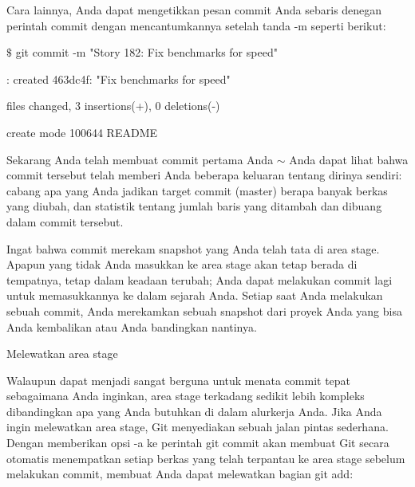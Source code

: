 \noindent 
{\fontsize{14pt}{14pt}\selectfont Cara lainnya, Anda dapat mengetikkan pesan commit Anda sebaris denegan perintah $  $commit $  $dengan mencantumkannya setelah tanda -m seperti berikut: \\} \par
\vspace{14pt}
\noindent 
{\fontsize{14pt}{14pt}\selectfont  $  \$  $ git commit -m "Story 182: Fix benchmarks for speed" \\} \par
\noindent 
{\fontsize{14pt}{14pt}\selectfont [master]: created 463dc4f: "Fix benchmarks for speed" \\} \par
\noindent 
{\fontsize{14pt}{14pt} files changed, 3 insertions(+), 0 deletions(-) \\} \par
\noindent 
{\fontsize{14pt}{14pt}\selectfont create mode 100644 README \\} \par
\vspace{14pt}
\noindent 
{\fontsize{14pt}{14pt}\selectfont Sekarang Anda telah membuat commit pertama Anda $  \sim  $ Anda dapat lihat bahwa commit tersebut telah memberi Anda beberapa keluaran tentang dirinya sendiri: cabang apa yang Anda jadikan target commit (master) berapa banyak berkas yang diubah, dan statistik tentang jumlah baris yang ditambah dan dibuang dalam commit tersebut. \\} \par
\noindent 
{\fontsize{14pt}{14pt}\selectfont Ingat bahwa commit merekam snapshot yang Anda telah tata di area stage. Apapun yang tidak Anda masukkan ke area stage akan tetap berada di tempatnya, tetap dalam keadaan terubah; Anda dapat melakukan commit lagi untuk memasukkannya ke dalam sejarah Anda. Setiap saat Anda melakukan sebuah commit, Anda merekamkan sebuah snapshot dari proyek Anda yang bisa Anda kembalikan atau Anda bandingkan nantinya. \\} \par
\vspace{14pt}
\noindent 
{\fontsize{14pt}{14pt}\selectfont Melewatkan area stage \\} \par
\noindent 
{\fontsize{14pt}{14pt}\selectfont Walaupun dapat menjadi sangat berguna untuk menata commit tepat sebagaimana Anda inginkan, area stage terkadang sedikit lebih kompleks dibandingkan apa yang Anda butuhkan di dalam alurkerja Anda. Jika Anda ingin melewatkan area stage, Git menyediakan sebuah jalan pintas sederhana. Dengan memberikan opsi $  $-a $  $ke perintah $  $git commit $  $akan membuat Git secara otomatis menempatkan setiap berkas yang telah terpantau ke area stage sebelum melakukan commit, membuat Anda dapat melewatkan bagian $  $git add: \\} \par
